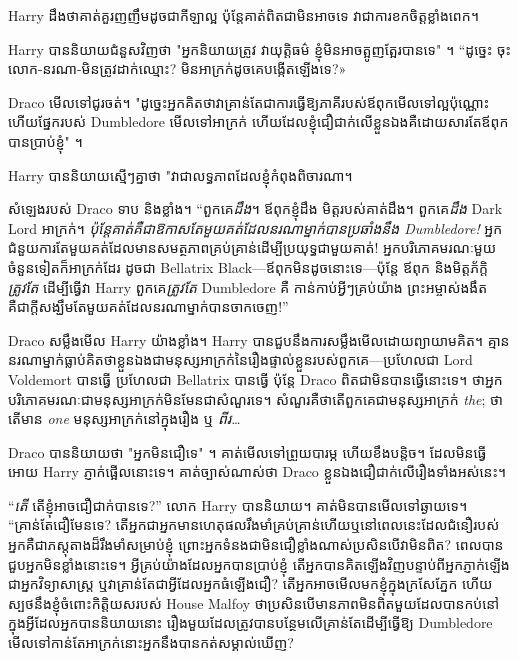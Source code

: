 {{{{{Harry ដឹងថាគាត់គួរញញឹមដូចជាកីឡាល្អ ប៉ុន្តែគាត់ពិតជាមិនអាចទេ វាជាការខកចិត្តខ្លាំងពេក។

Harry បាននិយាយជំនួសវិញថា "អ្នកនិយាយត្រូវ វាយុត្តិធម៌ ខ្ញុំមិនអាចត្អូញត្អែរបានទេ" ។ “ដូច្នេះ ចុះលោក-នរណា-មិនត្រូវដាក់ឈ្មោះ? មិន​អាក្រក់​ដូច​គេ​បង្កើត​ឡើង​ទេ?»

Draco មើលទៅជូរចត់។ "ដូច្នេះអ្នកគិតថាវាគ្រាន់តែជាការធ្វើឱ្យភាគីរបស់ឪពុកមើលទៅល្អប៉ុណ្ណោះ ហើយផ្នែករបស់ Dumbledore មើលទៅអាក្រក់ ហើយដែលខ្ញុំជឿជាក់លើខ្លួនឯងគឺដោយសារតែឪពុកបានប្រាប់ខ្ញុំ" ។

Harry បាននិយាយស្មើៗគ្នាថា "វាជាលទ្ធភាពដែលខ្ញុំកំពុងពិចារណា។

សំឡេងរបស់ Draco ទាប និងខ្លាំង។ “ពួកគេ\emph{ដឹង}។ ឪពុក​ខ្ញុំ​ដឹង មិត្ត​របស់​គាត់​ដឹង។ ពួកគេ\emph{ដឹង} Dark Lord អាក្រក់។ \emph{ប៉ុន្តែគាត់គឺជាឱកាសតែមួយគត់ដែលនរណាម្នាក់បានប្រឆាំងនឹង Dumbledore!} អ្នកជំនួយការតែមួយគត់ដែលមានសមត្ថភាពគ្រប់គ្រាន់ដើម្បីប្រយុទ្ធជាមួយគាត់! អ្នកបរិភោគមរណៈមួយចំនួនទៀតក៏អាក្រក់ដែរ ដូចជា Bellatrix Black—ឪពុកមិនដូចនោះទេ—ប៉ុន្តែ ឪពុក និងមិត្តភ័ក្តិ\emph{ត្រូវតែ} ដើម្បីធ្វើវា Harry ពួកគេ\emph{ត្រូវតែ} Dumbledore គឺ កាន់កាប់អ្វីៗគ្រប់យ៉ាង ព្រះអម្ចាស់ងងឹតគឺជាក្តីសង្ឃឹមតែមួយគត់ដែលនរណាម្នាក់បានចាកចេញ!”

Draco សម្លឹងមើល Harry យ៉ាងខ្លាំង។ Harry បាន​ជួប​នឹង​ការ​សម្លឹង​មើល​ដោយ​ព្យាយាម​គិត​។ គ្មាននរណាម្នាក់ធ្លាប់គិតថាខ្លួនឯងជាមនុស្សអាក្រក់នៃរឿងផ្ទាល់ខ្លួនរបស់ពួកគេ—ប្រហែលជា Lord Voldemort បានធ្វើ ប្រហែលជា Bellatrix បានធ្វើ ប៉ុន្តែ Draco ពិតជាមិនបានធ្វើនោះទេ។ ថា​អ្នក​បរិភោគ​មរណៈ​ជា​មនុស្ស​អាក្រក់​មិន​មែន​ជា​សំណួរ​ទេ។ សំណួរគឺថាតើពួកគេជាមនុស្សអាក្រក់ \emph{the}; ថាតើមាន \emph{one} មនុស្សអាក្រក់នៅក្នុងរឿង ឬ \emph{ពីរ…}

Draco បាននិយាយថា "អ្នកមិនជឿទេ" ។ គាត់​មើល​ទៅ​ព្រួយ​បារម្ភ ហើយ​ខឹង​បន្តិច។ ដែលមិនធ្វើអោយ Harry ភ្ញាក់ផ្អើលនោះទេ។ គាត់ច្បាស់ណាស់ថា Draco ខ្លួនឯងជឿជាក់លើរឿងទាំងអស់នេះ។

“\emph{តើ} តើខ្ញុំអាចជឿជាក់បានទេ?” លោក Harry បាននិយាយ។ គាត់មិនបានមើលទៅឆ្ងាយទេ។ “គ្រាន់តែជឿមែនទេ? តើ​អ្នក​ជា​អ្នក​មាន​ហេតុផល​រឹងមាំ​គ្រប់គ្រាន់​ហើយ​ឬ​នៅ​ពេល​នេះ​ដែល​ជំនឿ​របស់​អ្នក​គឺ​ជា​ភស្តុតាង​ដ៏​រឹងមាំ​សម្រាប់​ខ្ញុំ ព្រោះ​អ្នក​ទំនង​ជា​មិន​ជឿ​ខ្លាំង​ណាស់​ប្រសិន​បើ​វា​មិន​ពិត? ពេល​បាន​ជួប​អ្នក​មិន​ខ្លាំង​នោះ​ទេ។ អ្វីគ្រប់យ៉ាងដែលអ្នកបានប្រាប់ខ្ញុំ តើអ្នកបានគិតឡើងវិញបន្ទាប់ពីអ្នកភ្ញាក់ឡើងជាអ្នកវិទ្យាសាស្ត្រ ឬវាគ្រាន់តែជាអ្វីដែលអ្នកធំឡើងជឿ? តើអ្នកអាចមើលមកខ្ញុំក្នុងក្រសែភ្នែក ហើយស្បថនឹងខ្ញុំចំពោះកិត្តិយសរបស់ House Malfoy ថាប្រសិនបើមានភាពមិនពិតមួយដែលបានកប់នៅក្នុងអ្វីដែលអ្នកបាននិយាយនោះ រឿងមួយដែលត្រូវបានបន្ថែមលើគ្រាន់តែដើម្បីធ្វើឱ្យ Dumbledore មើលទៅកាន់តែអាក្រក់នោះអ្នកនឹងបានកត់សម្គាល់ឃើញ?

}}}}}
